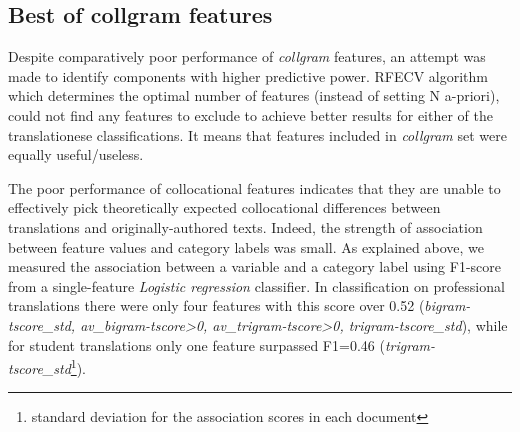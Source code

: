 \subsection{\label{ssec:best_collgram}Best of collgram features} 

Despite comparatively poor performance of \textit{collgram} features, an attempt was made to identify components with higher predictive power. \gls{RFECV} algorithm which determines the optimal number of features (instead of setting N a-priori), could not find any features to exclude to achieve better results for either of the translationese classifications. It means that features included in \textit{collgram} set were equally useful/useless. 



%

%
The poor performance of collocational features indicates that they are unable to effectively pick theoretically expected collocational differences between translations and originally-authored texts. Indeed, the strength of association between feature values and category labels was small. As explained above, we measured the association between a variable and a category label using F1-score from a single-feature \textit{Logistic regression} classifier. 
In classification on professional translations there were only four features with this score over 0.52 (\textit{bigram-tscore\_std, av\_bigram-tscore>0, av\_trigram-tscore>0, trigram-tscore\_std}), while for student translations only one feature surpassed F1=0.46 (\textit{trigram-tscore\_std}\footnote{standard deviation for the association scores in each document}). 

